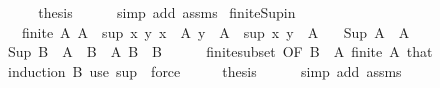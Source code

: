 \begin{isabellebody}
\ \ \isamarkupfalse%
\ \isamarkupfalse%
\ {\isacharquery}{\kern0pt}thesis\isanewline
\ \ \ \ \isamarkupfalse%
\ {\isacharparenleft}{\kern0pt}simp\ add{\isacharcolon}{\kern0pt}\ assms{\isacharparenright}{\kern0pt}\isanewline
{}\isamarkupfalse%
%
\endisatagproof
{\isafoldproof}%
%
\isadelimproof
\isanewline
%
\endisadelimproof
\isanewline
{}\isamarkupfalse%
\ finite{\isacharunderscore}{\kern0pt}Sup{\isacharunderscore}{\kern0pt}in{\isacharcolon}{\kern0pt}\isanewline
\ \ \ {\isachardoublequoteopen}finite\ A{\isachardoublequoteclose}\ {\isachardoublequoteopen}A{\isasymnoteq}{\isacharbraceleft}{\kern0pt}{\isacharbraceright}{\kern0pt}{\isachardoublequoteclose}\ \ sup{\isacharcolon}{\kern0pt}\ {\isachardoublequoteopen}{\isasymAnd}x\ y{\isachardot}{\kern0pt}\ {\isasymlbrakk}x\ {\isasymin}\ A{\isacharsemicolon}{\kern0pt}\ y\ {\isasymin}\ A{\isasymrbrakk}\ {\isasymLongrightarrow}\ sup\ x\ y\ {\isasymin}\ A{\isachardoublequoteclose}\isanewline
\ \ \ {\isachardoublequoteopen}Sup\ A\ {\isasymin}\ A{\isachardoublequoteclose}\isanewline
%
\isadelimproof
%
\endisadelimproof
%
\isatagproof
{}\isamarkupfalse%
\ {\isacharminus}{\kern0pt}\isanewline
\ \ \isamarkupfalse%
\ {\isachardoublequoteopen}Sup\ B\ {\isasymin}\ A{\isachardoublequoteclose}\ \ {\isachardoublequoteopen}B\ {\isasymle}\ A{\isachardoublequoteclose}\ {\isachardoublequoteopen}B{\isasymnoteq}{\isacharbraceleft}{\kern0pt}{\isacharbraceright}{\kern0pt}{\isachardoublequoteclose}\ \ B\isanewline
\ \ \ \ \isamarkupfalse%
\ finite{\isacharunderscore}{\kern0pt}subset\ {\isacharbrackleft}{\kern0pt}OF\ {\isacartoucheopen}B\ {\isasymsubseteq}\ A{\isacartoucheclose}\ {\isacartoucheopen}finite\ A{\isacartoucheclose}{\isacharbrackright}{\kern0pt}\ that\isanewline
\ \ \isamarkupfalse%
\ {\isacharparenleft}{\kern0pt}induction\ B{\isacharparenright}{\kern0pt}\ {\isacharparenleft}{\kern0pt}use\ sup\ \ {\isacartoucheopen}force{\isacharplus}{\kern0pt}{\isacartoucheclose}{\isacharparenright}{\kern0pt}\isanewline
\ \ \isamarkupfalse%
\ \isamarkupfalse%
\ {\isacharquery}{\kern0pt}thesis\isanewline
\ \ \ \ \isamarkupfalse%
\ {\isacharparenleft}{\kern0pt}simp\ add{\isacharcolon}{\kern0pt}\ assms{\isacharparenright}{\kern0pt}\isanewline
{}\isamarkupfalse%
%
\endisatagproof
{\isafoldproof}%
%
\isadelimproof
\isanewline
%
\endisadelimproof

\end{isabellebody}

